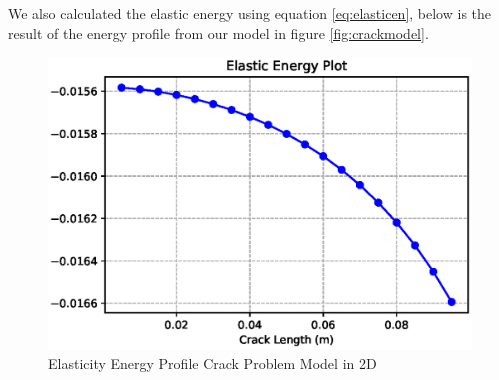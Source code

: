 \documentclass[a4paper,11pt]{article}
\begin{document}
\newline
We also calculated the elastic energy using equation \eqref{eq:elasticen}, below is the result of the energy profile from our model in figure \ref{fig:crackmodel}.
\begin{figure}[h!]
	\centering
	\includegraphics[width=0.8\linewidth]{picture/conference/elastic}
	\caption{Elasticity Energy Profile Crack Problem Model in 2D}
	\label{fig:elasticenergy}
\end{figure}

\newpage
\end{document}
